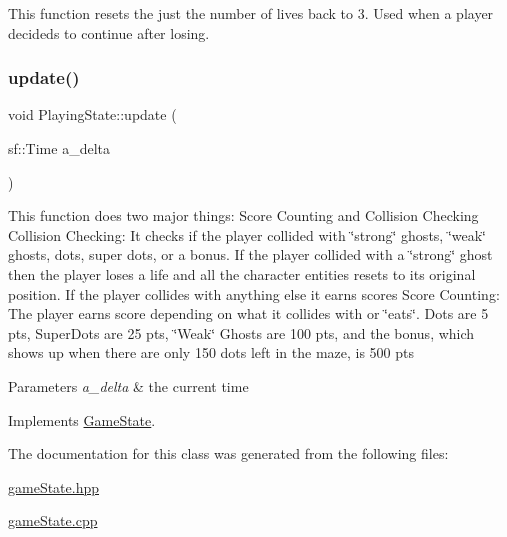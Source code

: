 This function resets the just the number of lives back to 3. Used when a player decideds to continue after losing. \mbox{\label{class_playing_state_a62b3904b8a971fed2f8fab4eb73bd9e5}} 
\subsubsection{\texorpdfstring{update()}{update()}}
{\footnotesize\ttfamily void Playing\+State\+::update (\begin{DoxyParamCaption}\item[{sf\+::\+Time}]{a\+\_\+delta }\end{DoxyParamCaption})\hspace{0.3cm}{\ttfamily [virtual]}}

This function does two major things\+: Score Counting and Collision Checking Collision Checking\+: It checks if the player collided with \char`\"{}strong\char`\"{} ghosts, \char`\"{}weak\char`\"{} ghosts, dots, super dots, or a bonus. If the player collided with a \char`\"{}strong\char`\"{} ghost then the player loses a life and all the character entities resets to its original position. If the player collides with anything else it earns scores Score Counting\+: The player earns score depending on what it collides with or \char`\"{}eats\char`\"{}. Dots are 5 pts, Super\+Dots are 25 pts, \char`\"{}\+Weak\char`\"{} Ghosts are 100 pts, and the bonus, which shows up when there are only 150 dots left in the maze, is 500 pts


\begin{DoxyParams}{Parameters}
{\em a\+\_\+delta} & the current time \\
\hline
\end{DoxyParams}


Implements \hyperlink{class_game_state_ab1fe4312f7ce88e7dc11f9935dee67d1}{Game\+State}.



The documentation for this class was generated from the following files\+:\begin{DoxyCompactItemize}
\item 
\hyperlink{game_state_8hpp}{game\+State.\+hpp}\item 
\hyperlink{game_state_8cpp}{game\+State.\+cpp}\end{DoxyCompactItemize}
